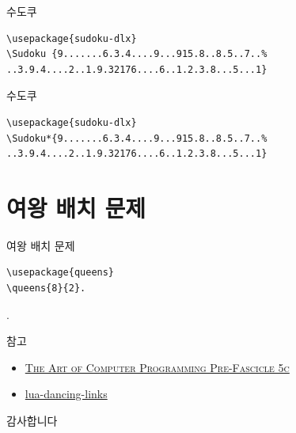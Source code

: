 \documentclass[xcolor=svgnames]{beamer}
\begin{document}
%
\begin{frame}[fragile]{수도쿠}
  \begin{Verbatim}[fontsize=\small]
\usepackage{sudoku-dlx}
\Sudoku {9.......6.3.4....9...915.8..8.5..7..%
..3.9.4....2..1.9.32176....6..1.2.3.8...5...1}
\end{Verbatim}  
\begin{center}
\end{center}
\end{frame}

%
\begin{frame}[fragile]{수도쿠}
\begin{Verbatim}[fontsize=\small]
\usepackage{sudoku-dlx}
\Sudoku*{9.......6.3.4....9...915.8..8.5..7..%
..3.9.4....2..1.9.32176....6..1.2.3.8...5...1}
\end{Verbatim}
\begin{center}
\end{center}
\end{frame}


\section{여왕 배치 문제}

%
\begin{frame}[fragile]{여왕 배치 문제}
\begin{verbatim}
\usepackage{queens}
\queens{8}{2}.
\end{verbatim}
\vspace{-10mm}
.
\end{frame}


%
\begin{frame}{참고}
  \begin{itemize}
  \item \href{http://www-cs-faculty.stanford.edu/~knuth/fasc5c.ps.gz}
    {\textsc{The Art of Computer Programming Pre-Fascicle 5c}}
  \item \href{https://github.com/sjnam/lua-dancing-links}
    {lua-dancing-links}
  \end{itemize}
\end{frame}

%
\begin{frame}[standout]
  감사합니다
\end{frame}
\end{document}
